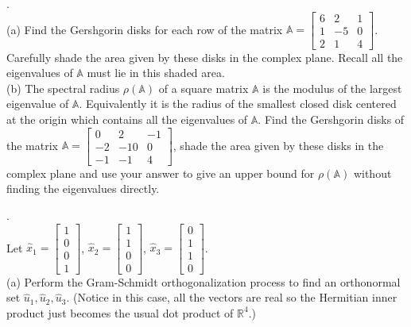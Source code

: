 \documentclass[12 pt]{article}
\begin{document}
\medskip

. \\ (a) Find the Gershgorin disks for each row of the matrix $\mathbb{A} = \begin{bmatrix} 6 & 2 & 1 \\ 1 & -5 & 0 \\ 2 & 1 & 4 \end{bmatrix}$. 
Carefully shade the area given by these disks in the complex plane. Recall all the eigenvalues of $\mathbb{A}$ must lie in this shaded area. \\

\noindent
(b) The spectral radius $\rho(\mathbb{A})$ of a square matrix $\mathbb{A}$ is the modulus of the largest eigenvalue of $\mathbb{A}$. Equivalently 
it is the radius of the smallest closed disk centered at the origin which contains all the eigenvalues of $\mathbb{A}$. Find the Gershgorin 
disks of the matrix $\mathbb{A}=\begin{bmatrix} 0 & 2 & -1 \\ -2 & -10 & 0 \\ -1 & -1 & 4 \end{bmatrix}$, shade the area given by these disks in the complex plane 
and use your answer to give an upper bound for $\rho(\mathbb{A})$ without finding the eigenvalues directly. 

\medskip


. \\ Let $\hat{x}_1 = \begin{bmatrix} 1 \\ 0 \\ 0 \\ 1 \end{bmatrix}$, $\hat{x}_2=\begin{bmatrix} 1 \\ 1 \\ 0 \\ 0 \end{bmatrix}$, $\hat{x}_3=\begin{bmatrix} 0 \\ 1 \\ 1 \\ 0 \end{bmatrix}$. \\

\noindent
(a) Perform the Gram-Schmidt orthogonalization process to find an orthonormal set $\hat{u}_1, \hat{u}_2, \hat{u}_3$. (Notice in this case, all the vectors are real so the Hermitian inner product just becomes the usual dot product of $\mathbb{R}^4$.) \\
\end{document}
